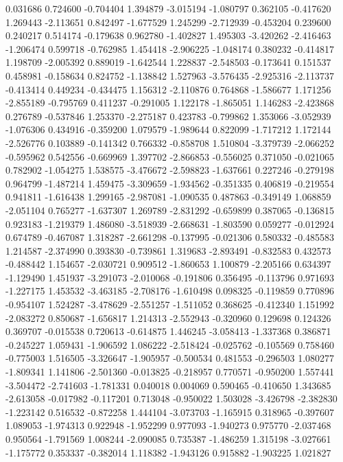 0.031686
0.724600
-0.704404
1.394879
-3.015194
-1.080797
0.362105
-0.417620
1.269443
-2.113651
0.842497
-1.677529
1.245299
-2.712939
-0.453204
0.239600
0.240217
0.514174
-0.179638
0.962780
-1.402827
1.495303
-3.420262
-2.416463
-1.206474
0.599718
-0.762985
1.454418
-2.906225
-1.048174
0.380232
-0.414817
1.198709
-2.005392
0.889019
-1.642544
1.228837
-2.548503
-0.173641
0.151537
0.458981
-0.158634
0.824752
-1.138842
1.527963
-3.576435
-2.925316
-2.113737
-0.413414
0.449234
-0.434475
1.156312
-2.110876
0.764868
-1.586677
1.171256
-2.855189
-0.795769
0.411237
-0.291005
1.122178
-1.865051
1.146283
-2.423868
0.276789
-0.537846
1.253370
-2.275187
0.423783
-0.799862
1.353066
-3.052939
-1.076306
0.434916
-0.359200
1.079579
-1.989644
0.822099
-1.717212
1.172144
-2.526776
0.103889
-0.141342
0.766332
-0.858708
1.510804
-3.379739
-2.066252
-0.595962
0.542556
-0.669969
1.397702
-2.866853
-0.556025
0.371050
-0.021065
0.782902
-1.054275
1.538575
-3.476672
-2.598823
-1.637661
0.227246
-0.279198
0.964799
-1.487214
1.459475
-3.309659
-1.934562
-0.351335
0.406819
-0.219554
0.941811
-1.616438
1.299165
-2.987081
-1.090535
0.487863
-0.349149
1.068859
-2.051104
0.765277
-1.637307
1.269789
-2.831292
-0.659899
0.387065
-0.136815
0.923183
-1.219379
1.486080
-3.518939
-2.668631
-1.803590
0.059277
-0.012924
0.674789
-0.467087
1.318287
-2.661298
-0.137995
-0.021306
0.580332
-0.485583
1.214587
-2.374990
0.393830
-0.739861
1.319683
-2.893491
-0.832583
0.432573
-0.488442
1.154657
-2.030721
0.909512
-1.860653
1.100879
-2.205166
0.634397
-1.129490
1.451937
-3.291073
-2.010068
-0.191806
0.356495
-0.113796
0.971693
-1.227175
1.453532
-3.463185
-2.708176
-1.610498
0.098325
-0.119859
0.770896
-0.954107
1.524287
-3.478629
-2.551257
-1.511052
0.368625
-0.412340
1.151992
-2.083272
0.850687
-1.656817
1.214313
-2.552943
-0.320960
0.129698
0.124326
0.369707
-0.015538
0.720613
-0.614875
1.446245
-3.058413
-1.337368
0.386871
-0.245227
1.059431
-1.906592
1.086222
-2.518424
-0.025762
-0.105569
0.758460
-0.775003
1.516505
-3.326647
-1.905957
-0.500534
0.481553
-0.296503
1.080277
-1.809341
1.141806
-2.501360
-0.013825
-0.218957
0.770571
-0.950200
1.557441
-3.504472
-2.741603
-1.781331
0.040018
0.004069
0.590465
-0.410650
1.343685
-2.613058
-0.017982
-0.117201
0.713048
-0.950022
1.503028
-3.426798
-2.382830
-1.223142
0.516532
-0.872258
1.444104
-3.073703
-1.165915
0.318965
-0.397607
1.089053
-1.974313
0.922948
-1.952299
0.977093
-1.940273
0.975770
-2.037468
0.950564
-1.791569
1.008244
-2.090085
0.735387
-1.486259
1.315198
-3.027661
-1.175772
0.353337
-0.382014
1.118382
-1.943126
0.915882
-1.903225
1.021827
